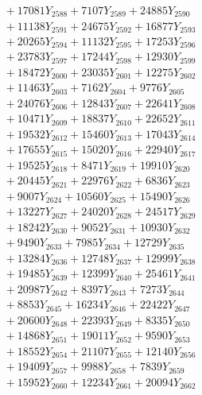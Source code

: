 \documentclass[a4paper,10pt]{article}
\begin{document}
{\begin{align}
&\;  + 17081 Y_{2588} + 7107 Y_{2589} + 24885 Y_{2590} \\[0.3ex]
&\;  + 11138 Y_{2591} + 24675 Y_{2592} + 16877 Y_{2593} \\[0.3ex]
&\;  + 20265 Y_{2594} + 11132 Y_{2595} + 17253 Y_{2596} \\[0.3ex]
&\;  + 23783 Y_{2597} + 17244 Y_{2598} + 12930 Y_{2599} \\[0.3ex]
&\;  + 18472 Y_{2600} + 23035 Y_{2601} + 12275 Y_{2602} \\[0.3ex]
&\;  + 11463 Y_{2603} + 7162 Y_{2604} + 9776 Y_{2605} \\[0.3ex]
&\;  + 24076 Y_{2606} + 12843 Y_{2607} + 22641 Y_{2608} \\[0.5ex]\allowbreak
&\;  + 10471 Y_{2609} + 18837 Y_{2610} + 22652 Y_{2611} \\[0.3ex]
&\;  + 19532 Y_{2612} + 15460 Y_{2613} + 17043 Y_{2614} \\[0.3ex]
&\;  + 17655 Y_{2615} + 15020 Y_{2616} + 22940 Y_{2617} \\[0.3ex]
&\;  + 19525 Y_{2618} + 8471 Y_{2619} + 19910 Y_{2620} \\[0.3ex]
&\;  + 20445 Y_{2621} + 22976 Y_{2622} + 6836 Y_{2623} \\[0.3ex]
&\;  + 9007 Y_{2624} + 10560 Y_{2625} + 15490 Y_{2626} \\[0.3ex]
&\;  + 13227 Y_{2627} + 24020 Y_{2628} + 24517 Y_{2629} \\[0.3ex]
&\;  + 18242 Y_{2630} + 9052 Y_{2631} + 10930 Y_{2632} \\[0.3ex]
&\;  + 9490 Y_{2633} + 7985 Y_{2634} + 12729 Y_{2635} \\[0.3ex]
&\;  + 13284 Y_{2636} + 12748 Y_{2637} + 12999 Y_{2638} \\[0.5ex]\allowbreak
&\;  + 19485 Y_{2639} + 12399 Y_{2640} + 25461 Y_{2641} \\[0.3ex]
&\;  + 20987 Y_{2642} + 8397 Y_{2643} + 7273 Y_{2644} \\[0.3ex]
&\;  + 8853 Y_{2645} + 16234 Y_{2646} + 22422 Y_{2647} \\[0.3ex]
&\;  + 20600 Y_{2648} + 22393 Y_{2649} + 8335 Y_{2650} \\[0.3ex]
&\;  + 14868 Y_{2651} + 19011 Y_{2652} + 9590 Y_{2653} \\[0.3ex]
&\;  + 18552 Y_{2654} + 21107 Y_{2655} + 12140 Y_{2656} \\[0.3ex]
&\;  + 19409 Y_{2657} + 9988 Y_{2658} + 7839 Y_{2659} \\[0.3ex]
&\;  + 15952 Y_{2660} + 12234 Y_{2661} + 20094 Y_{2662} \\[0.3ex]

\end{align}}
\end{document}
